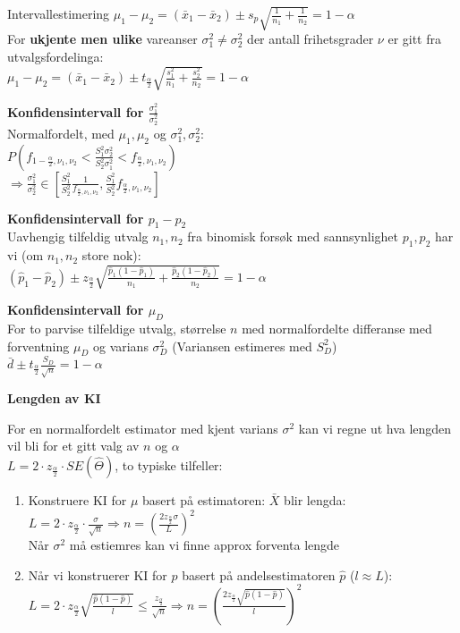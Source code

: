 \documentclass[final,hyperref={pdfpagelabels=false}]{beamer}
\newcommand{\tema}[2]{\footnotesize\raggedright\textbf{#1}\\{#2}\par}
\begin{document}
\begin{frame}{}
\begin{columns}[t]
\begin{column}{.25\linewidth}
\begin{block}{\center Intervallestimering}
{					$\mu_1-\mu_2=(\bar x_1 - \bar x_2) \pm s_p\sqrt{\frac{1}{n_1}+\frac{1}{n_2}}=1-\alpha$\\
					For \textbf{ukjente men ulike} vareanser $\sigma_1^2\neq \sigma_2^2$ der antall frihetsgrader $\nu$ er gitt fra utvalgsfordelinga: \\
					$\mu_1-\mu_2=(\bar x_1 - \bar x_2) \pm t_\frac{\alpha}{2}\sqrt{\frac{s_1^2}{n_1}+\frac{s_2^2}{n_2}}=1-\alpha$\\
				}
				\tema{Konfidensintervall for $\frac{\sigma_1^2}{\sigma_2^2}$}
				{Normalfordelt, med $\mu_1,\mu_2$ og $\sigma_1^2,\sigma_2^2$:\\
					$P\left( f_{1-\frac{\alpha}{2},\nu_1,\nu_2} < \frac{S_1^2\sigma_2^2}{S_2^2\sigma_1^2} <  f_{\frac{\alpha}{2},\nu_1,\nu_2}\right)$\\
					$\Rightarrow \frac{\sigma_1^2}{\sigma_2^2} \in \left[ \frac{S_1^2}{S_2^2}\frac{1}{f_{\frac{\alpha}{2},\nu_1,\nu_2}}, \frac{S_1^2}{S_2^2}f_{\frac{\alpha}{2},\nu_1,\nu_2} \right] $
				}
				\tema{Konfidensintervall for $p_1-p_2$}
				{Uavhengig tilfeldig utvalg $n_1,n_2$ fra binomisk forsøk med sannsynlighet $p_1,p_2$ har vi (om $n_1,n_2$ store nok):\\
					$(\hat p_1 - \hat p_2) \pm z_\frac{\alpha}{2} \sqrt{\frac{\hat p_1 (1 - \hat p_1)}{n_1} + \frac{\hat p_2 (1 - \hat p_2)}{n_2}}=1-\alpha$
				}
				\tema{Konfidensintervall for $\mu_D$}
				{For to parvise tilfeldige utvalg, størrelse $n$ med normalfordelte differanse med forventning $\mu_D$ og varians $\sigma^2_D$ (Variansen estimeres med $S_D^2$) \\
					$\bar d \pm t_\frac{\alpha}{2}\frac{S_D}{\sqrt{n}}=1-\alpha$\\
				}
				\tema{Lengden av KI}
				{For en normalfordelt estimator med kjent varians $\sigma^2$ kan vi regne ut hva lengden vil bli for et gitt valg av $n$ og $\alpha$ \\
					$L=2\cdot z_\frac{\alpha}{2}\cdot SE(\hat\Theta)$, to typiske tilfeller:
					\begin{enumerate}
						\item Konstruere KI for $\mu$ basert på estimatoren: $\bar X$ blir lengda:\\
							$L=2\cdot z_\frac{\alpha}{2}\cdot \frac{\sigma}{\sqrt{n}}\Rightarrow n=\left( \frac{2z_\frac{\alpha}{2}\sigma}{L} \right)^2$\\
							Når $\sigma^2$ må estiemres kan vi finne approx forventa lengde\\
						\item Når vi konstruerer KI for $p$ basert på andelsestimatoren $\hat p$ ($l \approx L$):\\
							$L=2\cdot z_\frac{\alpha}{2}\sqrt{\frac{\hat p (1 - \hat p)}{l}}\leq \frac{z_\frac{\alpha}{2}}{\sqrt{n}}\Rightarrow n=\left( \frac{2z_\frac{\alpha}{2}\sqrt{\hat p (1 - \hat p)}}{l} \right)^2$


\end{enumerate}}
\end{block}
\end{column}
\end{columns}
\end{frame}
\end{document}
